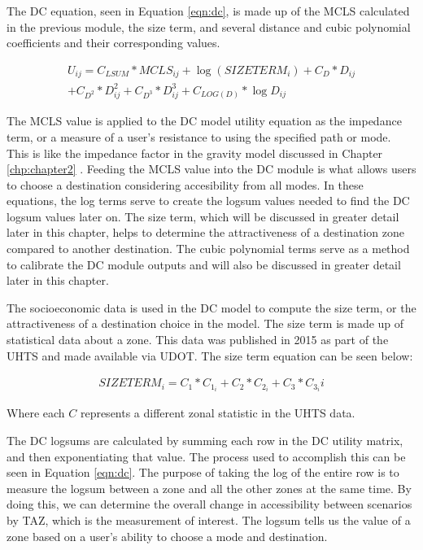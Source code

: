 The DC equation, seen in Equation \ref{eqn:dc}, is made up of the
MCLS calculated in the previous module, the size term, and several distance and cubic polynomial
coefficients and their corresponding values.

\begin{equation}
\begin{aligned}
	U_{ij} = C_{LSUM} * MCLS_{ij} + \log (SIZETERM_{i}) + C_{D} * D_{ij}\\ + C_{D^2} *
  D^2_{ij} + C_{D^3} * D^3_{ij} + C_{LOG(D)} * \log D_{ij}
\label{eqn:dc}
\end{aligned}
\end{equation}

The MCLS value is applied to the DC model utility equation as the impedance
term, or a measure of
a user’s resistance to using the specified path or mode. This is like the
impedance factor in the
gravity model discussed in Chapter \ref{chp:chapter2} . Feeding the MCLS value into
the DC module is what allows
users to choose a destination considering accesibility from all modes. In these
equations, the log terms serve to create the logsum values needed to find
the DC logsum values later on.
The size term, which
will be discussed in greater detail later in this chapter, helps to determine
the attractiveness
of a destination zone compared to another destination. The cubic polynomial
terms serve as a
method to calibrate the DC module outputs and will also be discussed in
greater detail later in
this chapter.

The socioeconomic data is used in the DC model to compute the size term, or
the attractiveness of
a destination choice in the model. The size term is made up of statistical
data about a zone.
This data was published in 2015 as part of the UHTS and made available via
UDOT. The size term
equation can be seen below:

\begin{equation}
\begin{aligned}
	SIZETERM_i = C_1 * C_{1_i} + C_{2} * C_{2_i} + C_{3} * C_{3_i}i
	\label{sizeterm}
\end{aligned}
\end{equation}

\noindent Where each $C$ represents a different zonal statistic in the UHTS data.

The DC logsums are calculated by summing each row in the DC utility matrix,
and then
exponentiating that value. The process used to accomplish this can be seen
in Equation \ref{eqn:dc}.
The purpose of taking the log of the entire row is to measure the logsum
between a zone and all
the other zones at the same time. By doing this, we can determine the overall
change in accessibility
between scenarios by TAZ, which is the measurement of interest. The logsum
tells us the value of
a zone based on a user’s ability to choose a mode and destination.

